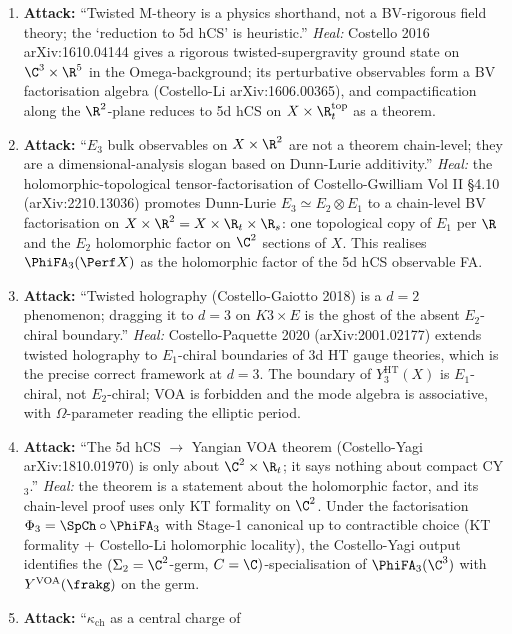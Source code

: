 \begin{enumerate}
\item[(A1)] \textbf{Attack:} ``Twisted M-theory is a physics shorthand,
not a BV-rigorous field theory; the `reduction to 5d hCS' is
heuristic.''
\emph{Heal:} Costello 2016 arXiv:1610.04144 gives a rigorous
twisted-supergravity ground state on $\C^3 \times \R^5$ in the
Omega-background; its perturbative observables form a BV factorisation
algebra (Costello-Li arXiv:1606.00365), and compactification along the
$\R^2$-plane reduces to 5d hCS on $X \times \R_t^{\mathrm{top}}$ as a
theorem.
\item[(A2)] \textbf{Attack:} ``$E_3$ bulk observables on $X \times \R^2$
are not a theorem chain-level; they are a dimensional-analysis slogan
based on Dunn-Lurie additivity.''
\emph{Heal:} the holomorphic-topological tensor-factorisation of
Costello-Gwilliam Vol II \S4.10 (arXiv:2210.13036) promotes Dunn-Lurie
$E_3 \simeq E_2 \otimes E_1$ to a chain-level BV factorisation on
$X \times \R^2 = X \times \R_t \times \R_s$: one topological copy of
$E_1$ per $\R$ and the $E_2$ holomorphic factor on $\C^2$ sections of
$X$. This realises $\PhiFA_3(\Perf X)$ as the holomorphic factor of
the 5d hCS observable FA.
\item[(A3)] \textbf{Attack:} ``Twisted holography (Costello-Gaiotto 2018)
is a $d=2$ phenomenon; dragging it to $d=3$ on $K3 \times E$ is the
ghost of the absent $E_2$-chiral boundary.''
\emph{Heal:} Costello-Paquette 2020 (arXiv:2001.02177) extends twisted
holography to $E_1$-chiral boundaries of $3$d HT gauge theories, which
is the precise correct framework at $d=3$. The boundary of
$Y^{\mathrm{HT}}_3(X)$ is $E_1$-chiral, not $E_2$-chiral; VOA is
forbidden and the mode algebra is associative, with
$\Omega$-parameter reading the elliptic period.
\item[(A4)] \textbf{Attack:} ``The 5d hCS $\to$ Yangian VOA theorem
(Costello-Yagi arXiv:1810.01970) is only about $\C^2 \times \R_t$; it
says nothing about compact CY$_3$.''
\emph{Heal:} the theorem is a statement about the holomorphic factor,
and its chain-level proof uses only KT formality on $\C^2$. Under the
factorisation $\Phi_3 = \SpCh \circ \PhiFA_3$ with Stage-1 canonical up
to contractible choice (KT formality + Costello-Li holomorphic
locality), the Costello-Yagi output identifies the
$(\Sigma_2 = \C^2$-germ, $C = \C)$-specialisation of $\PhiFA_3(\C^3)$
with $Y^{\mathrm{VOA}}(\frakg)$ on the germ.
\item[(A5)] \textbf{Attack:} ``$\kappa_{\mathrm{ch}}$ as a central charge of

\end{enumerate}
